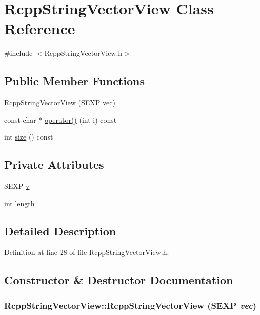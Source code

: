 \hypertarget{classRcppStringVectorView}{
\section{RcppStringVectorView Class Reference}
\label{classRcppStringVectorView}
}


{\ttfamily \#include $<$RcppStringVectorView.h$>$}\subsection*{Public Member Functions}
\begin{DoxyCompactItemize}
\item 
\hyperlink{classRcppStringVectorView_ac74085bb16d7a13b58eb59f69268ec85}{RcppStringVectorView} (SEXP vec)
\item 
const char $\ast$ \hyperlink{classRcppStringVectorView_a7bbba53f770cc8e4492eea07c91a6f44}{operator()} (int i) const 
\item 
int \hyperlink{classRcppStringVectorView_ad4d268fd0fd4c21b2ddc0de5126ce21b}{size} () const 
\end{DoxyCompactItemize}
\subsection*{Private Attributes}
\begin{DoxyCompactItemize}
\item 
SEXP \hyperlink{classRcppStringVectorView_a1db3cc1a2dd1809151351c123343c15e}{v}
\item 
int \hyperlink{classRcppStringVectorView_aef6edaa52c234b4bb1fd1fc949fa0f25}{length}
\end{DoxyCompactItemize}


\subsection{Detailed Description}


Definition at line 28 of file RcppStringVectorView.h.

\subsection{Constructor \& Destructor Documentation}
\hypertarget{classRcppStringVectorView_ac74085bb16d7a13b58eb59f69268ec85}{
\subsubsection[{RcppStringVectorView}]{\setlength{\rightskip}{0pt plus 5cm}RcppStringVectorView::RcppStringVectorView (SEXP {\em vec})}}
\label{classRcppStringVectorView_ac74085bb16d7a13b58eb59f69268ec85}


